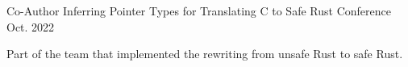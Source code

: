

\begin{cventries}

  \cventry
    {Co-Author} %
    {Inferring Pointer Types for Translating C to Safe Rust} %
    {Conference} %
    {Oct. 2022} %
    {
      \begin{cvitems} %
        \item {Part of the team that implemented the rewriting from unsafe Rust to safe Rust.}
      \end{cvitems}
    }

\end{cventries}
